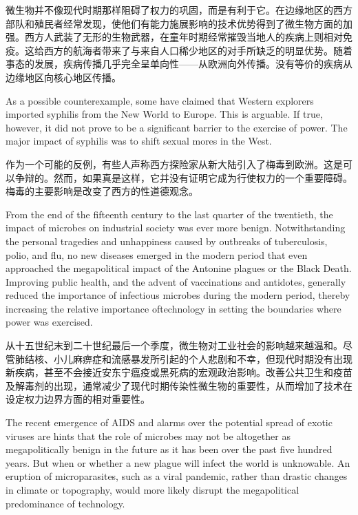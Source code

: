 \begin{Parallel}{97mm}{72mm}
  \ParallelRText
  {微生物并不像现代时期那样阻碍了权力的巩固，而是有利于它。在边缘地区的西方部队和殖民者经常发现，使他们有能力施展影响的技术优势得到了微生物方面的加强。西方人武装了无形的生物武器，在童年时期经常摧毁当地人的疾病上则相对免疫。这给西方的航海者带来了与来自人口稀少地区的对手所缺乏的明显优势。随着事态的发展，疾病传播几乎完全呈单向性——从欧洲向外传播。没有等价的疾病从边缘地区向核心地区传播。}
  \ParallelPar



  \ParallelLText
  {As a possible counterexample, some have claimed that Western explorers imported syphilis from the New World to Europe. This is arguable. If true, however, it did not prove to be a significant barrier to the exercise of power. The major impact of syphilis was to shift sexual mores in the West.}
  
  \ParallelRText
  {作为一个可能的反例，有些人声称西方探险家从新大陆引入了梅毒到欧洲。这是可以争辩的。然而，如果真是这样，它并没有证明它成为行使权力的一个重要障碍。梅毒的主要影响是改变了西方的性道德观念。}
  \ParallelPar


  \ParallelLText
  {From the end of the fifteenth century to the last quarter of the twentieth, the impact of microbes on industrial society was ever more benign. Notwithstanding the personal tragedies and unhappiness caused by outbreaks of tuberculosis, polio, and flu, no new diseases emerged in the modern period that even approached the megapolitical impact of the Antonine plagues or the Black Death. Improving public health, and the advent of vaccinations and antidotes, generally reduced the importance of infectious microbes during the modern period, thereby increasing the relative importance oftechnology in setting the boundaries where power was exercised.}
  
  \ParallelRText
  {从十五世纪末到二十世纪最后一个季度，微生物对工业社会的影响越来越温和。尽管肺结核、小儿麻痹症和流感暴发所引起的个人悲剧和不幸，但现代时期没有出现新疾病，甚至不会接近安东宁瘟疫或黑死病的宏观政治影响。改善公共卫生和疫苗及解毒剂的出现，通常减少了现代时期传染性微生物的重要性，从而增加了技术在设定权力边界方面的相对重要性。}
  \ParallelPar


  \ParallelLText
  {The recent emergence of AIDS and alarms over the potential spread of exotic viruses are hints that the role of microbes may not be altogether as megapolitically benign in the future as it has been over the past five hundred years. But when or whether a new plague will infect the world is unknowable. An eruption of microparasites, such as a viral pandemic, rather than drastic changes in climate or topography, would more likely disrupt the megapolitical predominance of technology.}
  

\end{Parallel}
